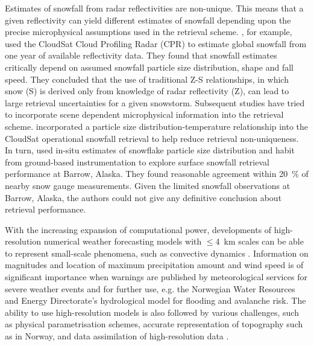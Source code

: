 Estimates of snowfall from radar reflectivities are non-unique.  This means that a given reflectivity can yield different estimates of snowfall depending upon the precise microphysical assumptions used in the retrieval scheme. \citet{kulie_utilizing_2009}, for example, used the CloudSat Cloud Profiling Radar (CPR) to estimate global snowfall from one year of available reflectivity data. They found that snowfall estimates critically depend on assumed snowfall particle size distribution, shape and fall speed.  They concluded that the use of traditional Z-S relationships, in which snow (S) is derived only from knowledge of radar reflectivity (Z), can lead to large retrieval uncertainties for a given snowstorm.  Subsequent studies have tried to incorporate scene dependent microphysical information into the retrieval scheme. \citet{wood_estimation_2011} incorporated a particle size distribution-temperature relationship into the CloudSat operational snowfall retrieval to help reduce retrieval non-uniqueness.  In turn, \citet{cooper_variational_2017} used in-situ estimates of snowflake particle size distribution and habit from ground-based instrumentation to explore surface snowfall retrieval performance at Barrow, Alaska. They found reasonable agreement within \SI{20}{\percent} of nearby snow gauge measurements. Given the limited snowfall observations at Barrow, Alaska, the authors could not give any definitive conclusion about retrieval performance.
\par\medskip
\noindent
With the increasing expansion of computational power, developments of high-resolution numerical weather forecasting models with $\le$\SI{4}{\km} scales can be able to represent small-scale phenomena, such as convective dynamics \citep{gowan_validation_2018}. 
Information on magnitudes and location of maximum precipitation amount and wind speed is of significant importance when warnings are published by meteorological services for severe weather events and for further use, e.g. the Norwegian Water Resources and Energy Directorate's hydrological model for flooding and avalanche risk.
The ability to use high-resolution models is also followed by various challenges, such as physical parametrisation schemes, accurate representation of topography such as in Norway, and data assimilation of high-resolution data \citep{sun_convective-scale_2005}. 
